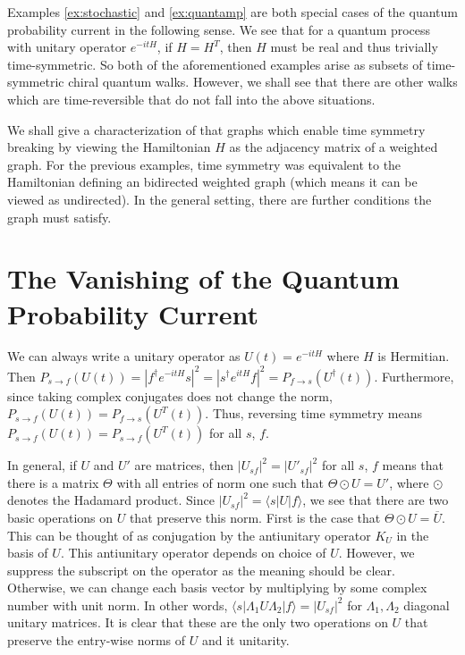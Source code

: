 \documentclass[twocolumn,superscriptaddress]{revtex4-1}
\theoremstyle{plain}
\theoremstyle{definition}
\theoremstyle{definition}
\theoremstyle{definition}
\theoremstyle{definition}
\theoremstyle{definition}
\theoremstyle{definition}
\begin{document}
 Examples \ref{ex:stochastic} and \ref{ex:quantamp} are both special cases of the quantum probability current in the following sense.  We see that for a quantum process with unitary operator $e^{-itH}$, if $H=H^T$, then $H$ must be real and thus trivially time-symmetric. So both of the aforementioned examples arise as subsets of time-symmetric chiral quantum walks. However, we shall see that there are other walks which are time-reversible that do not fall into the above situations.

We shall give a characterization of that graphs which enable time symmetry breaking by viewing the Hamiltonian $H$ as the adjacency matrix of a weighted graph. For the previous examples, time symmetry was equivalent to the Hamiltonian defining an bidirected weighted graph (which means it can be viewed as undirected). In the general setting, there are further conditions the graph must satisfy.

\section{The Vanishing of the Quantum Probability Current}\label{sec:probcurr}

We can always write a unitary operator as $U(t)=e^{-itH}$ where $H$ is Hermitian. Then $P_{s\to f}(U(t))=|f^\dagger e^{-itH} s|^2=|s^\dagger e^{itH} f|^2=P_{f\to s}(U^\dagger(t))$. Furthermore, since taking complex conjugates does not change the norm, $P_{s\to f}(U(t))=P_{f\to s}(U^T(t))$. Thus, reversing time symmetry means $P_{s\to f}(U(t))=P_{s\to f}(U^T(t))$ for all $s$, $f$.


In general, if $U$ and $U'$ are matrices, then $|U_{sf}|^2=|U'_{sf}|^2$ for all $s$, $f$ means that there is a matrix $\Theta$ with all entries of norm one such that $\Theta\odot U=U'$, where $\odot$ denotes the Hadamard product. Since $|U_{sf}|^2=\langle s|U|f\rangle$, we see that there are two basic operations on $U$ that preserve this norm. First is the case that $\Theta\odot U=\overline{U}$. This can be thought of as conjugation by the antiunitary operator $K_U$ in the basis of $U$. This antiunitary operator depends on choice of $U$. However, we suppress the subscript on the operator as the meaning should be clear. Otherwise, we can change each basis vector by multiplying by some complex number with unit norm. In other words, $\langle s|\Lambda_1 U\Lambda_2|f\rangle=|U_{sf}|^2$ for $\Lambda_1,\Lambda_2$ diagonal unitary matrices. It is clear that these are the only two operations on $U$ that preserve the entry-wise norms of $U$ and it unitarity.
\end{document}
